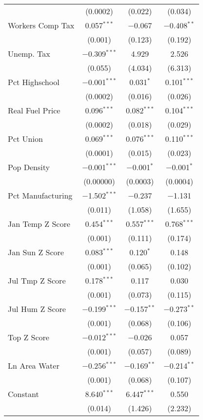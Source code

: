 \begin{table}[!htbp]
\begin{tabular}{@{\extracolsep{5pt}}lccc}
  & (0.0002) & (0.022) & (0.034) \\ 
  Workers Comp Tax & 0.057$^{***}$ & $-$0.067 & $-$0.408$^{**}$ \\ 
  & (0.001) & (0.123) & (0.192) \\ 
  Unemp. Tax & $-$0.309$^{***}$ & 4.929 & 2.526 \\ 
  & (0.055) & (4.034) & (6.313) \\ 
  Pct Highschool & $-$0.001$^{***}$ & 0.031$^{*}$ & 0.101$^{***}$ \\ 
  & (0.0002) & (0.016) & (0.026) \\ 
  Real Fuel Price & 0.096$^{***}$ & 0.082$^{***}$ & 0.104$^{***}$ \\ 
  & (0.0002) & (0.018) & (0.029) \\ 
  Pct Union & 0.069$^{***}$ & 0.076$^{***}$ & 0.110$^{***}$ \\ 
  & (0.0001) & (0.015) & (0.023) \\ 
  Pop Density & $-$0.001$^{***}$ & $-$0.001$^{*}$ & $-$0.001$^{*}$ \\ 
  & (0.00000) & (0.0003) & (0.0004) \\ 
  Pct Manufacturing & $-$1.502$^{***}$ & $-$0.237 & $-$1.131 \\ 
  & (0.011) & (1.058) & (1.655) \\ 
  Jan Temp Z Score & 0.454$^{***}$ & 0.557$^{***}$ & 0.768$^{***}$ \\ 
  & (0.001) & (0.111) & (0.174) \\ 
  Jan Sun Z Score & 0.083$^{***}$ & 0.120$^{*}$ & 0.148 \\ 
  & (0.001) & (0.065) & (0.102) \\ 
  Jul Tmp Z Score & 0.178$^{***}$ & 0.117 & 0.030 \\ 
  & (0.001) & (0.073) & (0.115) \\ 
  Jul Hum Z Score & $-$0.199$^{***}$ & $-$0.157$^{**}$ & $-$0.273$^{**}$ \\ 
  & (0.001) & (0.068) & (0.106) \\ 
  Top Z Score & $-$0.012$^{***}$ & $-$0.026 & 0.057 \\ 
  & (0.001) & (0.057) & (0.089) \\ 
  Ln Area Water & $-$0.256$^{***}$ & $-$0.169$^{**}$ & $-$0.214$^{**}$ \\ 
  & (0.001) & (0.068) & (0.107) \\ 
  Constant & 8.640$^{***}$ & 6.447$^{***}$ & 0.550 \\ 
  & (0.014) & (1.426) & (2.232) \\ 

\end{tabular}
\end{table}
